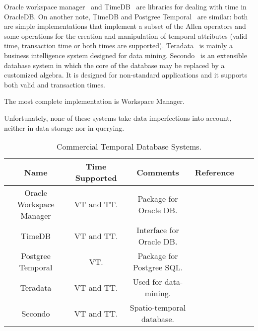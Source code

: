 Oracle workspace manager~\cite{oracle2009} and TimeDB~\cite{timedb2005} are libraries for dealing with time in OracleDB. On another note, TimeDB and Postgree Temporal~\cite{posgree2009} are similar: both are simple implementations that implement a subset of the Allen operators and some operations for the creation and manipulation of temporal attributes (valid time, transaction time or both times are supported). Teradata~\cite{teradata2011} is mainly a business intelligence system designed for data mining. Secondo~\cite{Dieker2000} is an extensible database system in which the core of the database may be replaced by a customized algebra. It is designed for non-standard applications and it supports both valid and transaction times. 

 The most complete implementation is Workspace Manager.

Unfortunately, none of these systems take data imperfections into account, neither in data storage nor in querying.

\begin{table}
\centering
\caption{Commercial Temporal Database Systems. }
\begin{tabular}{c c c c c c }
\hline
\textbf{Name} & \textbf{Time Supported} & \textbf{Comments} & \textbf{Reference}  \\ \hline
Oracle Workspace Manager & VT and TT. & Package for Oracle DB. & \cite{oracle2009}\\
TimeDB & VT and TT. & Interface for Oracle DB. & \cite{timedb2005}\\
Postgree Temporal & VT. & Package for Postgree SQL. & \cite{posgree2009}\\
Teradata & VT and TT. & Used for data-mining. & \cite{teradata2011}\\
Secondo & VT and TT. & Spatio-temporal database. & \cite{Guting} \\
\hline 
\end{tabular}
\label{table:commercial-temporal-db}



\end{table}

